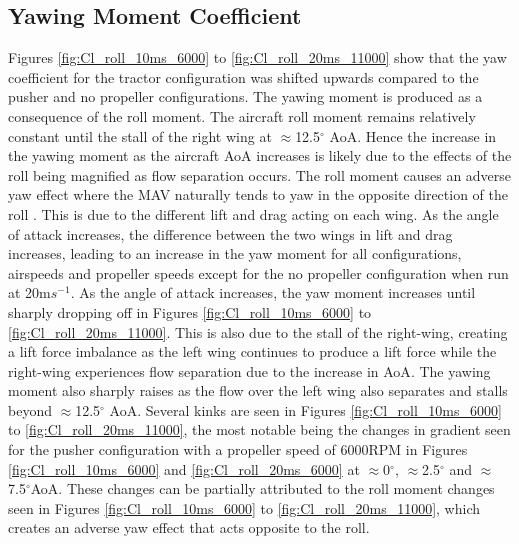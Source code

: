 \subsection{Yawing Moment Coefficient}
 Figures \ref{fig:Cl_roll_10ms_6000} to \ref{fig:Cl_roll_20ms_11000} show that the yaw coefficient for the tractor configuration was shifted upwards compared to the pusher and no propeller configurations. The yawing moment is produced as a consequence of the roll moment. The aircraft roll moment remains relatively constant until the stall of the right wing at $\approx$12.5$^{\circ}$ \acrshort{AoA}. Hence the increase in the yawing moment as the aircraft \acrshort{AoA} increases is likely due to the effects of the roll being magnified as flow separation occurs. The roll moment causes an adverse yaw effect where the \acrshort{MAV} naturally tends to yaw in the opposite direction of the roll \cite{Arivoli2011}. This is due to the different lift and drag acting on each wing. As the angle of attack increases, the difference between the two wings in lift and drag increases, leading to an increase in the yaw moment for all configurations, airspeeds and propeller speeds except for the no propeller configuration when run at 20m$s^{-1}$. As the angle of attack increases, the yaw moment increases until sharply dropping off in Figures \ref{fig:Cl_roll_10ms_6000} to \ref{fig:Cl_roll_20ms_11000}. This is also due to the stall of the right-wing, creating a lift force imbalance as the left wing continues to produce a lift force while the right-wing experiences flow separation due to the increase in \acrshort{AoA}. The yawing moment also sharply raises as the flow over the left wing also separates and stalls beyond $\approx$12.5$^{\circ}$ \acrshort{AoA}. Several kinks are seen in Figures \ref{fig:Cl_roll_10ms_6000} to \ref{fig:Cl_roll_20ms_11000}, the most notable being the changes in gradient seen for the pusher configuration with a propeller speed of 6000RPM in Figures \ref{fig:Cl_roll_10ms_6000} and \ref{fig:Cl_roll_20ms_6000} at $\approx$0$^{\circ}$, $\approx$2.5$^{\circ}$ and $\approx$7.5$^{\circ}$\acrshort{AoA}. These changes can be partially attributed to the roll moment changes seen in Figures \ref{fig:Cl_roll_10ms_6000} to \ref{fig:Cl_roll_20ms_11000}, which creates an adverse yaw effect that acts opposite to the roll. 

